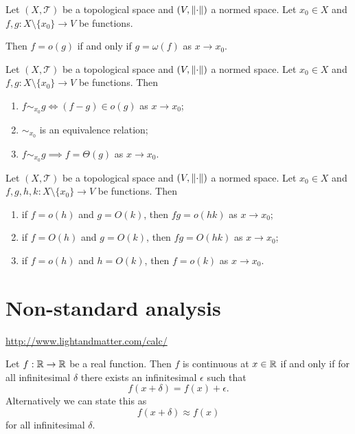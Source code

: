 \begin{lemma}
Let $(X,\mathcal{T})$ be a topological space and $(V,\lVert\cdot\rVert)$ a normed space. Let $x_0 \in X$ and $f,g: X\setminus\{x_0\}\to V$ be functions.

Then $f = o(g)$ \textup{if and only if} $g = \omega(f)$ as $x\to x_0$.
\end{lemma}

\begin{lemma}
Let $(X,\mathcal{T})$ be a topological space and $(V,\lVert\cdot\rVert)$ a normed space. Let $x_0 \in X$ and $f,g: X\setminus\{x_0\}\to V$ be functions. Then
\begin{enumerate}
\item $f\sim_{x_0} g \iff (f-g)\in o(g)$ as $x\to x_0$;
\item $\sim_{x_0}$ is an equivalence relation;
\item $f \sim_{x_0} g \implies f = \Theta(g)$ as $x\to x_0$.
\end{enumerate}
\end{lemma}

\begin{lemma}
Let $(X,\mathcal{T})$ be a topological space and $(V,\lVert\cdot\rVert)$ a normed space. Let $x_0 \in X$ and $f,g, h,k: X\setminus\{x_0\}\to V$ be functions. Then
\begin{enumerate}
\item if $f = o(h)$ and $g = O(k)$, then $fg = o(hk)$ as $x\to x_0$;
\item if $f = O(h)$ and $g = O(k)$, then $fg = O(hk)$ as $x\to x_0$;
\item if $f = o(h)$ and $h = O(k)$, then $f = o(k)$ as $x\to x_0$.
\end{enumerate}
\end{lemma}




\chapter{Non-standard analysis}
\url{http://www.lightandmatter.com/calc/}

\begin{proposition}
Let $f:\mathbb{R}\to\mathbb{R}$ be a real function. Then $f$ is continuous at $x\in\mathbb{R}$ \textup{if and only if} for all infinitesimal $\delta$ there exists an infinitesimal $\epsilon$ such that
\[ f(x+\delta) = f(x) + \epsilon. \]
Alternatively we can state this as
\[ f(x+\delta) \approx f(x) \]
for all infinitesimal $\delta$.
\end{proposition}

